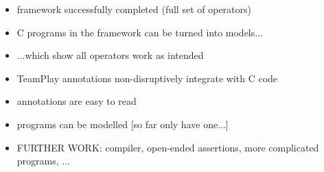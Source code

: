 \begin{itemize}
    \item framework successfully completed (full set of operators)
    \item C programs in the framework can be turned into \Idris models...
    \item ...which show all operators work as intended
    \item TeamPlay annotations non-disruptively integrate with C code
    \item annotations are easy to read
    \item programs can be modelled {[so far only have one...]}
    \item FURTHER WORK: compiler, open-ended assertions, more complicated
          programs, ...
\end{itemize}
